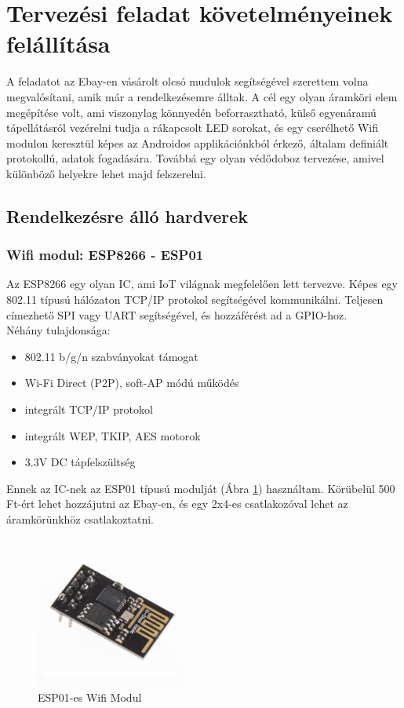 \documentclass[../main.tex]{subfiles}
\begin{document}
\section{Tervezési feladat követelményeinek felállítása}
    A feladatot az Ebay-en vásárolt olcsó mudulok segítségével szerettem volna megvalósítani, amik már a rendelkezésemre álltak. A cél egy olyan áramköri elem megépítése volt, ami viszonylag könnyedén beforrasztható, külső egyenáramú tápellátásról vezérelni tudja a rákapcsolt LED sorokat, és egy cserélhető Wifi modulon keresztül képes az Androidos applikációnkból érkező, általam definiált protokollú, adatok fogadására. Továbbá egy olyan védődoboz tervezése, amivel különböző helyekre lehet majd felszerelni.
    
    \subsection{Rendelkezésre álló hardverek}
        \subsubsection{Wifi modul: ESP8266 - ESP01} %
            Az ESP8266 egy olyan IC, ami IoT világnak megfelelően lett tervezve. Képes egy 802.11 típusú hálózaton TCP/IP protokol segítségével kommunikálni. Teljesen címezhető SPI vagy UART segítségével, és hozzáférést ad a GPIO-hoz.\\[12px]
            Néhány tulajdonsága:
            \begin{itemize}
                \item 802.11 b/g/n szabványokat támogat
                \item Wi-Fi Direct (P2P), soft-AP módú működés
                \item integrált TCP/IP protokol
                \item integrált WEP, TKIP, AES motorok
                \item 3.3V DC tápfelszültség
            \end{itemize}
            
            Ennek az IC-nek az ESP01 típusú modulját (Ábra \ref{fig:esp01}) használtam. Körübelül 500 Ft-ért lehet hozzájutni az Ebay-en, és egy 2x4-es csatlakozóval lehet az áramkörünkhöz csatlakoztatni.
            
            \begin{figure}[h!]
                \centering
                    \includegraphics[width=5cm]{resources/pcb_res/esp01.jpg}
                \caption{ESP01-es Wifi Modul}
                \label{fig:esp01}
            \end{figure}
        
\end{document}
